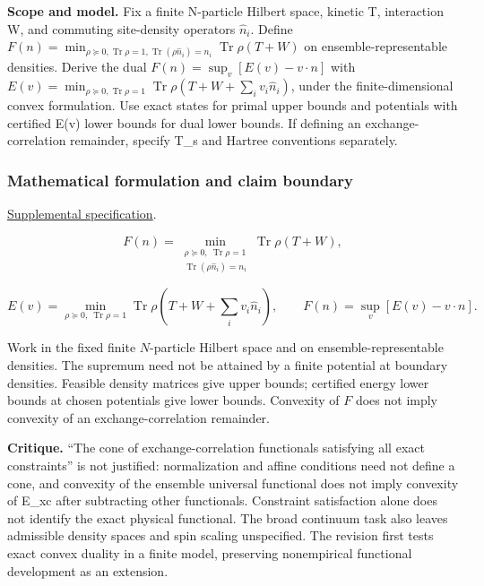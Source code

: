 \documentclass[
  11pt,
]{article}
\newcounter{none} %
\begin{document}
\textbf{Scope and model.} Fix a finite N-particle Hilbert space, kinetic
T, interaction W, and commuting site-density operators \(\widehat n_i\).
Define
\(F(n)=\min_{\rho\succeq0,\operatorname{Tr}\rho=1,\operatorname{Tr}(\rho\widehat n_i)=n_i}\operatorname{Tr}\rho(T+W)\)
on ensemble-representable densities. Derive the dual
\(F(n)=\sup_v[E(v)-v\cdot n]\) with
\(E(v)=\min_{\rho\succeq0,\operatorname{Tr}\rho=1}\operatorname{Tr}\rho(T+W+\sum_i v_i\widehat n_i)\),
under the finite-dimensional convex formulation. Use exact states for
primal upper bounds and potentials with certified E(v) lower bounds for
dual lower bounds. If defining an exchange-correlation remainder,
specify T\_s and Hartree conventions separately.

\subsubsection{Mathematical formulation and claim boundary}

\href{https://github.com/rick-stevens-ai/Pure-Thought/blob/main/supplemental/S05.md}{Supplemental
specification}.

\[F(n)=\min_{\substack{\rho\succeq0,\ \operatorname{Tr}\rho=1\\
\operatorname{Tr}(\rho\widehat n_i)=n_i}}
\operatorname{Tr}\rho(T+W),\]

\[E(v)=\min_{\rho\succeq0,\ \operatorname{Tr}\rho=1}
\operatorname{Tr}\rho\!\left(T+W+\sum_i v_i\widehat n_i\right),
\qquad F(n)=\sup_v[E(v)-v\cdot n].\]

Work in the fixed finite \(N\)-particle Hilbert space and on
ensemble-representable densities. The supremum need not be attained by a
finite potential at boundary densities. Feasible density matrices give
upper bounds; certified energy lower bounds at chosen potentials give
lower bounds. Convexity of \(F\) does not imply convexity of an
exchange-correlation remainder.

\textbf{Critique.} ``The cone of exchange-correlation functionals
satisfying all exact constraints'' is not justified: normalization and
affine conditions need not define a cone, and convexity of the ensemble
universal functional does not imply convexity of E\_xc after subtracting
other functionals. Constraint satisfaction alone does not identify the
exact physical functional. The broad continuum task also leaves
admissible density spaces and spin scaling unspecified. The revision
first tests exact convex duality in a finite model, preserving
nonempirical functional development as an extension.
\end{document}
